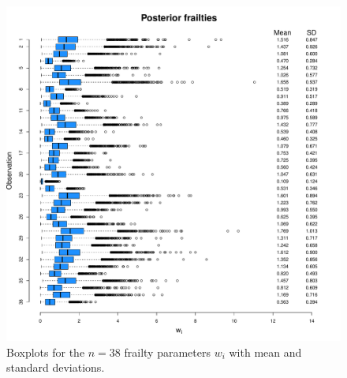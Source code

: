 \documentclass[12pt]{article}
\begin{document}
\begin{figure}
\centering
\includegraphics[scale=0.5]{figs/frailty.pdf}
\caption{Boxplots for the $n=38$ frailty parameters $w_i$ with mean and standard deviations.}
\end{figure}
\end{document}
